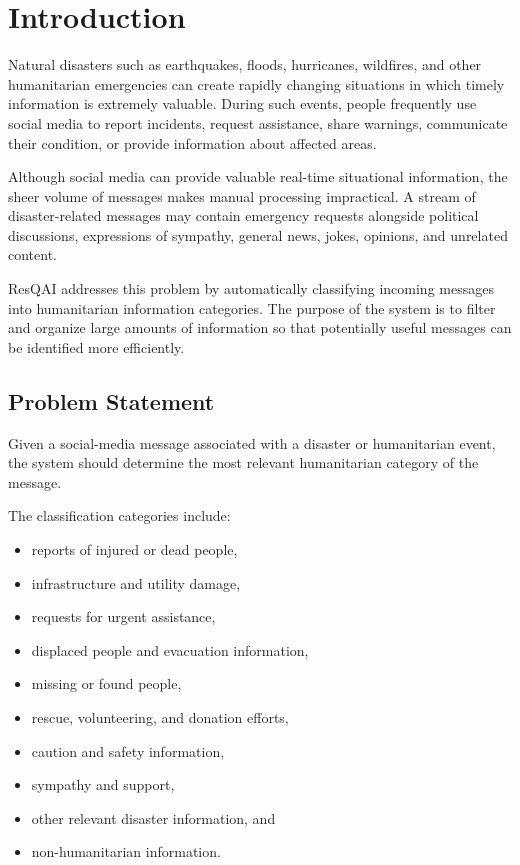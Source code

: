 \documentclass[12pt,a4paper]{article}
\begin{document}
\tableofcontents
\newpage

\section{Introduction}

Natural disasters such as earthquakes, floods, hurricanes, wildfires, and
other humanitarian emergencies can create rapidly changing situations in
which timely information is extremely valuable. During such events, people
frequently use social media to report incidents, request assistance, share
warnings, communicate their condition, or provide information about affected
areas.

Although social media can provide valuable real-time situational information,
the sheer volume of messages makes manual processing impractical. A stream of
disaster-related messages may contain emergency requests alongside political
discussions, expressions of sympathy, general news, jokes, opinions, and
unrelated content.

ResQAI addresses this problem by automatically classifying incoming messages
into humanitarian information categories. The purpose of the system is to
filter and organize large amounts of information so that potentially useful
messages can be identified more efficiently.

\subsection{Problem Statement}

Given a social-media message associated with a disaster or humanitarian
event, the system should determine the most relevant humanitarian category
of the message.

The classification categories include:

\begin{itemize}
    \item reports of injured or dead people,
    \item infrastructure and utility damage,
    \item requests for urgent assistance,
    \item displaced people and evacuation information,
    \item missing or found people,
    \item rescue, volunteering, and donation efforts,
    \item caution and safety information,
    \item sympathy and support,
    \item other relevant disaster information, and
    \item non-humanitarian information.
\end{itemize}
\end{document}
